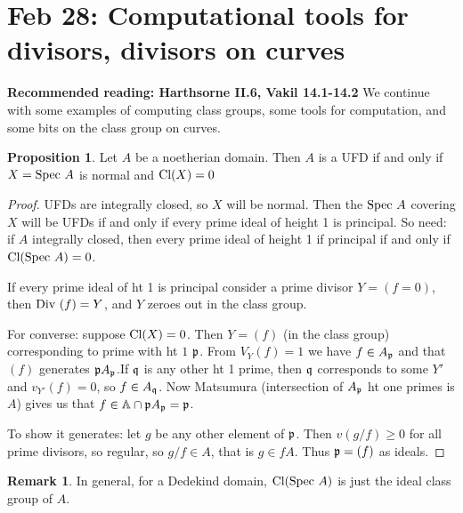 \documentclass[10pt,reqno]{amsart}
\theoremstyle{definition}
\newtheorem{proposition}[theorem]{Proposition}
\newtheorem{remark}[theorem]{Remark}
\theoremstyle{remark}
\numberwithin{equation}{section}
\numberwithin{theorem}{section}
\newcommand*{\red}{\textcolor{red}}
\newcommand{\spec}{\textup{Spec }}
\newcommand{\Div}{\textup{Div }}
\newcommand{\cl}{\textup{Cl}}
\newcommand{\pp}{\frak{p}}
\newcommand{\qq}{\frak{q}}
\newcommand{\A}{{\mathbb A}}
\begin{document}
\section{Feb 28: Computational tools for divisors, divisors on curves}
\textbf{Recommended reading: Harthsorne II.6, Vakil 14.1-14.2}
We continue with some examples of computing class groups, some tools for computation, and some bits on the class group on curves. 
\vspace{1em}

\begin{proposition} Let $A$ be a noetherian domain. Then $A$ is a UFD if and only if $X = \spec A$ is normal and $\cl(X) = 0$
\end{proposition}

\begin{proof} 
UFDs are integrally closed, so $X$ will be normal. Then the $\spec A$ covering $X$ will be UFDs if and only if every prime ideal of height 1 is principal. So need: if $A$ integrally closed, then every prime ideal of height 1 if principal if and only if $\cl(\spec A) = 0$.

If every prime ideal of ht 1 is principal consider a prime divisor $Y = (f = 0)$, then $\Div (f) = Y$, and $Y$ zeroes out in the class group.

For converse: suppose $\cl(X) = 0$. Then $Y = (f)$ (in the class group) corresponding to prime with ht $1$ $\pp$. From $V_Y(f) = 1$ we have $f \in A_{\pp}$ and that $(f)$ generates $\frak{p}A_{\frak{p}}$.If $\qq$ is any other ht 1 prime, then $\qq$ corresponds to some $Y'$ and $v_{Y'}(f) = 0$, so $f \in A_{\qq}$. Now Matsumura (intersection of $A_{\pp}$ ht one primes is $A$) gives us that $f \in \A \cap \pp A_{\pp} = \pp$. 
 
To show it generates: let $g$ be any other element of $\pp$. Then $v(g/f) \ge 0$ for all prime divisors, so regular, so $g/f \in A$, that is $g \in fA$. Thus $\pp = (f)$ as ideals.
\end{proof}
\begin{remark} In general, for a Dedekind domain, $\cl(\spec A)$ is just the ideal class group of $A$.
\end{remark}
\end{document}
